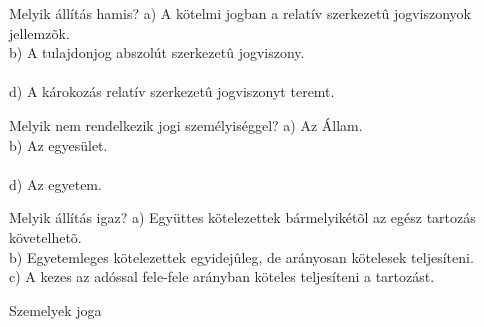 \begin{frame}

\begin{tcolorbox}[title={37. Kérdés}]
Melyik állítás hamis?
\tcblower
a) A kötelmi jogban a relatív szerkezetû jogviszonyok jellemzõk.\\
b) A tulajdonjog abszolút szerkezetû jogviszony.\\
\\
d) A károkozás relatív szerkezetû jogviszonyt teremt.
\end{tcolorbox}

\begin{tcolorbox}[title={38. Kérdés}]
Melyik nem rendelkezik jogi személyiséggel?
\tcblower
a) Az Állam.\\
b) Az egyesület.\\
\\
d) Az egyetem.
\end{tcolorbox}

\begin{tcolorbox}[title={39. Kérdés}]
Melyik állítás igaz?
\tcblower
a) Együttes kötelezettek bármelyikétõl az egész tartozás követelhetõ.\\
b) Egyetemleges kötelezettek egyidejûleg, de arányosan kötelesek teljesíteni.\\
c) A kezes az adóssal fele-fele arányban köteles teljesíteni a tartozást.\\
\end{tcolorbox}

\end{frame}

\begin{frame}[plain]
\begin{tcolorbox}[center, colback={myyellow}, coltext={black}, colframe={myyellow}]
    { Szemelyek joga}\\
\end{tcolorbox}
\end{frame}

